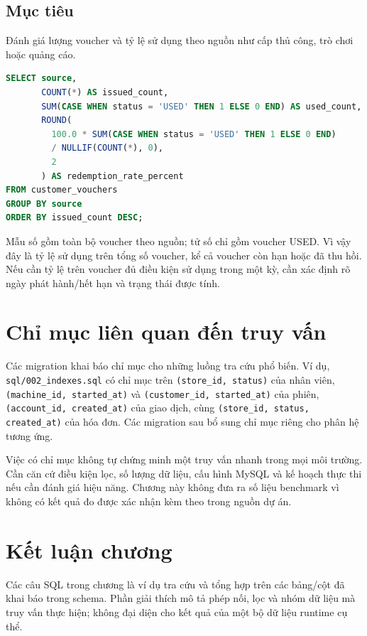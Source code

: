\subsection*{Mục tiêu}
Đánh giá lượng voucher và tỷ lệ sử dụng theo nguồn như cấp thủ công, trò chơi hoặc quảng cáo.
\begin{lstlisting}[language=SQL]
SELECT source,
       COUNT(*) AS issued_count,
       SUM(CASE WHEN status = 'USED' THEN 1 ELSE 0 END) AS used_count,
       ROUND(
         100.0 * SUM(CASE WHEN status = 'USED' THEN 1 ELSE 0 END)
         / NULLIF(COUNT(*), 0),
         2
       ) AS redemption_rate_percent
FROM customer_vouchers
GROUP BY source
ORDER BY issued_count DESC;
\end{lstlisting}

Mẫu số gồm toàn bộ voucher theo nguồn; tử số chỉ gồm voucher USED. Vì vậy đây là tỷ lệ sử dụng trên tổng số voucher, kể cả voucher còn hạn hoặc đã thu hồi. Nếu cần tỷ lệ trên voucher đủ điều kiện sử dụng trong một kỳ, cần xác định rõ ngày phát hành/hết hạn và trạng thái được tính.

\section{Chỉ mục liên quan đến truy vấn}
Các migration khai báo chỉ mục cho những luồng tra cứu phổ biến. Ví dụ, \texttt{sql/002\_indexes.sql} có chỉ mục trên \texttt{(store\_id, status)} của nhân viên, \texttt{(machine\_id, started\_at)} và \texttt{(customer\_id, started\_at)} của phiên, \texttt{(account\_id, created\_at)} của giao dịch, cùng \texttt{(store\_id, status, created\_at)} của hóa đơn. Các migration sau bổ sung chỉ mục riêng cho phân hệ tương ứng.

Việc có chỉ mục không tự chứng minh một truy vấn nhanh trong mọi môi trường. Cần căn cứ điều kiện lọc, số lượng dữ liệu, cấu hình MySQL và kế hoạch thực thi nếu cần đánh giá hiệu năng. Chương này không đưa ra số liệu benchmark vì không có kết quả đo được xác nhận kèm theo trong nguồn dự án.

\section{Kết luận chương}
Các câu SQL trong chương là ví dụ tra cứu và tổng hợp trên các bảng/cột đã khai báo trong schema. Phần giải thích mô tả phép nối, lọc và nhóm dữ liệu mà truy vấn thực hiện; không đại diện cho kết quả của một bộ dữ liệu runtime cụ thể.
